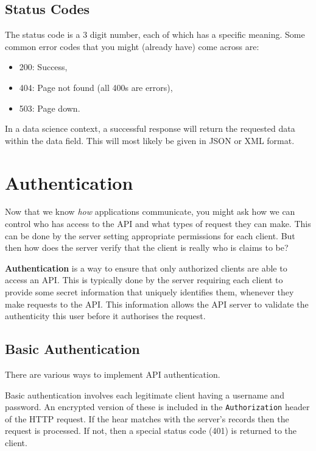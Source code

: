 \documentclass[
  letterpaper,
  DIV=11,
  numbers=noendperiod]{scrreprt}
\providecommand{\tightlist}{%
  \setlength{\itemsep}{0pt}\setlength{\parskip}{0pt}}\usepackage{longtable,booktabs,array}
\begin{document}
\subsection{Status Codes}\label{status-codes}

The status code is a 3 digit number, each of which has a specific
meaning. Some common error codes that you might (already have) come
across are:

\begin{itemize}
\tightlist
\item
  200: Success,
\item
  404: Page not found (all 400s are errors),
\item
  503: Page down.
\end{itemize}

In a data science context, a successful response will return the
requested data within the data field. This will most likely be given in
JSON or XML format.

\section{Authentication}\label{authentication}

Now that we know \emph{how} applications communicate, you might ask how
we can control who has access to the API and what types of request they
can make. This can be done by the server setting appropriate permissions
for each client. But then how does the server verify that the client is
really who is claims to be?

\textbf{Authentication} is a way to ensure that only authorized clients
are able to access an API. This is typically done by the server
requiring each client to provide some secret information that uniquely
identifies them, whenever they make requests to the API. This
information allows the API server to validate the authenticity this user
before it authorises the request.

\subsection{Basic Authentication}\label{basic-authentication}

There are various ways to implement API authentication.

Basic authentication involves each legitimate client having a username
and password. An encrypted version of these is included in the
\texttt{Authorization} header of the HTTP request. If the hear matches
with the server's records then the request is processed. If not, then a
special status code (401) is returned to the client.
\end{document}
